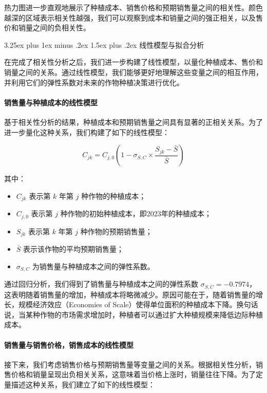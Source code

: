\documentclass[12pt,a4paper]{nmmcm}
\makeatletter
\renewcommand\subsection{\@startsection{subsection}{2}{0pt}%
    {3.25ex plus 1ex minus .2ex}%
    {1.5ex plus .2ex}%
    {\normalfont\Large\bfseries}}
\makeatother
\begin{document}
热力图进一步直观地展示了种植成本、销售价格和预期销售量之间的相关性。颜色越深的区域表示相关性越强，我们可以观察到成本和销量之间的强正相关，以及售价和销量之间的负相关性。

\subsection{线性模型与拟合分析}

在完成了相关性分析之后，我们进一步构建了线性模型，以量化种植成本、售价和销量之间的关系。通过线性模型，我们能够更好地理解这些变量之间的相互作用，并利用它们的弹性系数对未来的作物种植决策进行优化。

\paragraph{销售量与种植成本的线性模型}

基于相关性分析的结果，种植成本和预期销售量之间具有显著的正相关关系。为了进一步量化这种关系，我们构建了如下的线性模型：

\[
  C_{jk} = C_{j,0} \left(1 - \sigma_{S,C} \times \frac{S_{jk} - \bar{S}}{\bar{S}} \right)
\]

其中：
\begin{itemize}
  \item $C_{jk}$ 表示第 $k$ 年第 $j$ 种作物的种植成本；
  \item $C_{j,0}$ 表示第 $j$ 种作物的初始种植成本，即2023年的种植成本；
  \item $S_{jk}$ 表示第 $k$ 年第 $j$ 种作物的预期销售量；
  \item $\bar{S}$ 表示该作物的平均预期销售量；
  \item $\sigma_{S,C}$ 为销售量与种植成本之间的弹性系数。
\end{itemize}

通过回归分析，我们得到了销售量与种植成本之间的弹性系数 $\sigma_{S,C} = -0.7974$，这表明随着销售量的增加，种植成本将略微减少。原因可能在于，随着销售量的增长，规模经济效应（Economies of Scale）使得单位面积的种植成本下降。换句话说，当某种作物的市场需求增加时，种植者可以通过扩大种植规模来降低边际种植成本。

\paragraph{销售量与销售价格，销售成本的线性模型}

接下来，我们考虑销售价格与预期销售量等变量之间的关系。根据相关性分析，销售价格和销量呈现出负相关关系，这意味着当价格上涨时，销量往往下降。为了定量描述这种关系，我们建立了如下的线性模型：
\end{document}
